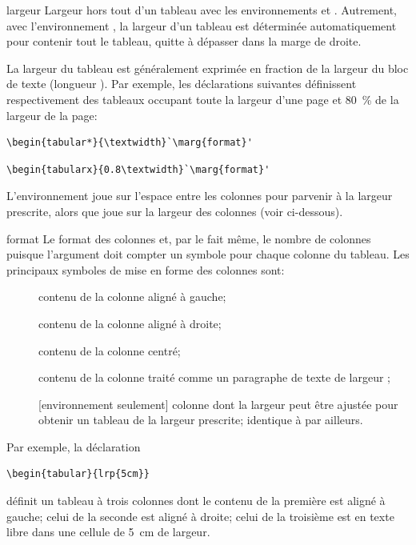 \begin{list}{}{%
    \setlength{\labelsep}{1.5ex}
    \setlength{\leftmargin}{\labelwidth}
    \addtolength{\leftmargin}{\labelsep}
    \setlength{\parsep}{0.5ex plus0.2ex minus0.2ex}
    \setlength{\itemsep}{0.3ex}
    \renewcommand{\makelabel}[1]{\meta{#1}\hfill}}
%
\item[largeur] Largeur hors tout d'un tableau avec les environnements
   et . Autrement, avec l'environnement
  , la largeur d'un tableau est déterminée automatiquement
  pour contenir tout le tableau, quitte à dépasser dans la marge de
  droite.

  La largeur du tableau est généralement exprimée en fraction de la
  largeur du bloc de texte (longueur ). Par exemple,
  les déclarations suivantes définissent respectivement des tableaux
  occupant toute la largeur d'une page et 80~\% de la largeur de la
  page:
\begin{lstlisting}
\begin{tabular*}{\textwidth}`\marg{format}'
\end{lstlisting}
\begin{lstlisting}
\begin{tabularx}{0.8\textwidth}`\marg{format}'
\end{lstlisting}
  L'environnement  joue sur l'espace entre les colonnes
  pour parvenir à la largeur prescrite, alors que  joue
  sur la largeur des colonnes (voir ci-dessous).
\item[format] Le format des colonnes et, par le fait même, le nombre
  de colonnes puisque l'argument doit compter un symbole pour chaque
  colonne du tableau. Les principaux symboles de mise en forme des
  colonnes sont:
  \begin{description}
  \item[\normalfont{}] contenu de la colonne aligné à gauche;
  \item[\normalfont{}] contenu de la colonne aligné à droite;
  \item[\normalfont{}] contenu de la colonne centré;
  \item[\normalfont{}] contenu de la
    colonne traité comme un paragraphe de texte de largeur
    ;
  \item[\normalfont{}] [environnement  seulement]
    colonne dont la largeur peut être ajustée pour obtenir un tableau
    de la largeur prescrite; identique à  par ailleurs.
  \end{description}
  Par exemple, la déclaration
\begin{lstlisting}
\begin{tabular}{lrp{5cm}}
\end{lstlisting}
  définit un tableau à trois colonnes dont le contenu de la première
  est aligné à gauche; celui de la seconde est aligné à droite; celui de
  la troisième est en texte libre dans une cellule de 5~cm de largeur.


\end{list}
